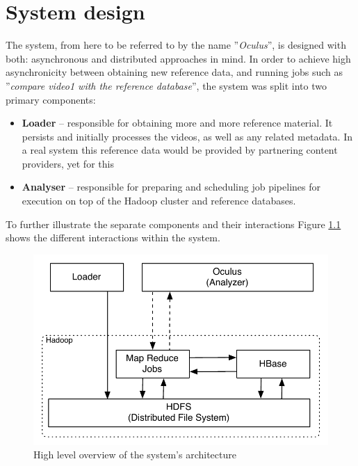 
\chapter{System design}
\label{chap:system-design}

The system, from here to be referred to by the name ''\textit{Oculus}'', is designed with both: asynchronous and distributed approaches in mind. In order to achieve high asynchronicity between obtaining new reference data, and running jobs such as ''\textit{compare video1 with the reference database}'', the system was split into two primary components: 

\begin{itemize}
  \item \textbf{Loader} -- responsible for obtaining more and more reference material. It persists and initially processes the videos, as well as any related metadata. In a real system this reference data would be provided by partnering content providers, yet for this 
  \item \textbf{Analyser} -- responsible for preparing and scheduling job pipelines for execution on top of the Hadoop cluster and reference databases.
\end{itemize}

To further illustrate the separate components and their interactions Figure \ref{fig:system-overview} shows the different interactions within the system.

\begin{figure}[hc!]
 \centering
  \includegraphics[scale=0.9]{./diagrams/high-level-system.pdf}
  \caption{High level overview of the system's architecture}
  \label{fig:system-overview}
\end{figure}

